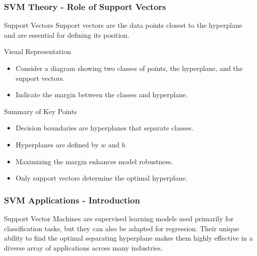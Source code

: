 \documentclass[aspectratio=169]{beamer}
\begin{document}
\begin{frame}[fragile]
    \frametitle{SVM Theory - Role of Support Vectors}
    \begin{block}{Support Vectors}
        Support vectors are the data points closest to the hyperplane and are essential for defining its position.
    \end{block}
    
    \begin{block}{Visual Representation}
        \begin{itemize}
            \item Consider a diagram showing two classes of points, the hyperplane, and the support vectors.
            \item Indicate the margin between the classes and hyperplane.
        \end{itemize}
    \end{block}
    
    \begin{block}{Summary of Key Points}
        \begin{itemize}
            \item Decision boundaries are hyperplanes that separate classes.
            \item Hyperplanes are defined by \( w \) and \( b \).
            \item Maximizing the margin enhances model robustness.
            \item Only support vectors determine the optimal hyperplane.
        \end{itemize}
    \end{block}
\end{frame}

\begin{frame}[fragile]
    \frametitle{SVM Applications - Introduction}
    Support Vector Machines are supervised learning models used primarily for classification tasks, but they can also be adapted for regression. Their unique ability to find the optimal separating hyperplane makes them highly effective in a diverse array of applications across many industries.
\end{frame}
\end{document}
